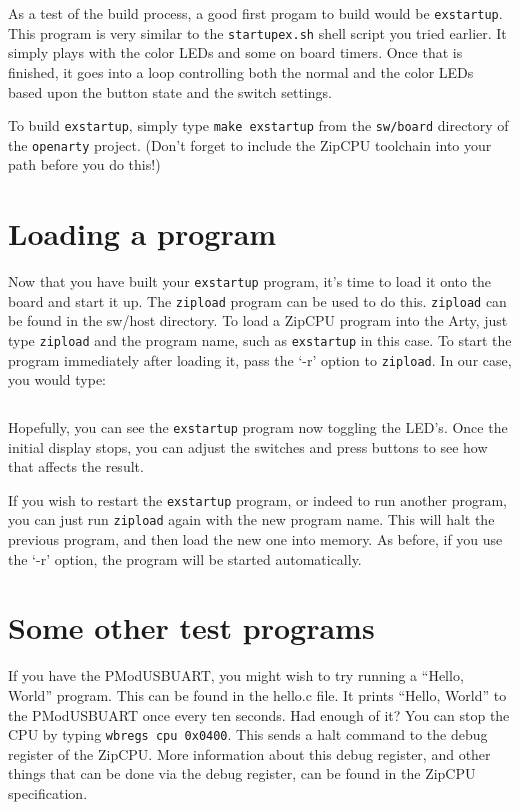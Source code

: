 \documentclass{gqtekspec}
\begin{document}
As a test of the build process, a good first progam to build would be 
{\tt exstartup}.  This program is very similar to the {\tt startupex.sh} shell
script you tried earlier.  It simply plays with the color LEDs and some
on board timers.   Once that is finished, it goes into a loop controlling
both the normal and the color LEDs based upon the button state and the switch
settings.

To build {\tt exstartup}, simply type {\tt make exstartup} from the 
{\tt sw/board} directory of the {\tt openarty} project.  (Don't forget to
include the ZipCPU toolchain into your path before you do this!)

\section{Loading a program}
Now that you have built your {\tt exstartup} program, it's time to load it
onto the board and start it up.  The {\tt zipload} program can be used to
do this.  {\tt zipload} can be found in the sw/host directory.  To load a
ZipCPU program into the Arty, just type {\tt zipload} and the program name,
such as {\tt exstartup} in this case.  To start the program immediately
after loading it, pass the `-r' option to {\tt zipload}.  In our case, you
would type:
\begin{lstlisting}[language=bash]
% zipload -r exstartup
\end{lstlisting}

Hopefully, you can see the {\tt exstartup} program now toggling the LED's.
Once the initial display stops, you can adjust the switches and press buttons
to see how that affects the result.

If you wish to restart the {\tt exstartup} program, or indeed to run another
program, you can just run {\tt zipload} again with the new program name.  This
will halt the previous program, and then load the new one into memory.  As 
before, if you use the `-r' option, the program will be started automatically.

\section{Some other test programs}
If you have the PModUSBUART, you might wish to try running a ``Hello, World''
program.  This can be found in the hello.c file.  It prints ``Hello, World''
to the PModUSBUART once every ten seconds.  Had enough of it?  You can stop
the CPU by typing {\tt wbregs cpu 0x0400}.  This sends a halt command to the
debug register of the ZipCPU.  More information about this debug register, and
other things that can be done via the debug register, can be found in the
ZipCPU specification.
\end{document}
